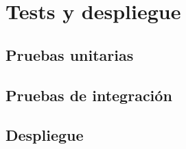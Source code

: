 \chapter{Tests y despliegue}

\section{Pruebas unitarias}

\section{Pruebas de integración}

\section{Despliegue}